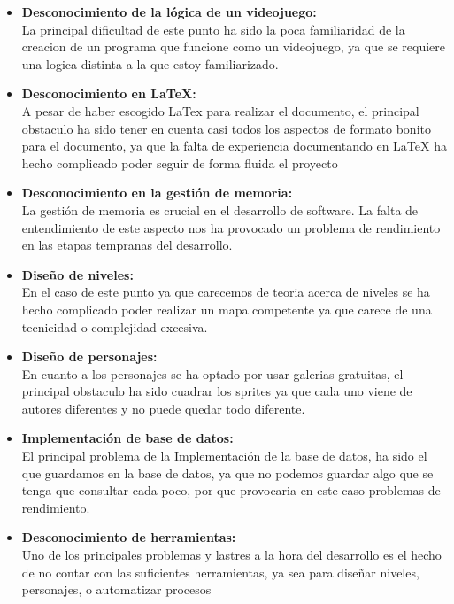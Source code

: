 \documentclass[a4paper]{article}
\begin{document}
    \begin{itemize}
        \item \textbf{Desconocimiento de la lógica de un videojuego:} \\
        La principal dificultad de este punto ha sido la poca familiaridad de la creacion de un programa que funcione como un videojuego, ya que se requiere una logica distinta a la que estoy familiarizado.
    
        \item \textbf{Desconocimiento en LaTeX:} \\
        A pesar de haber escogido LaTex para realizar el documento, el principal obstaculo ha sido tener en cuenta casi todos los aspectos de formato bonito para el documento, ya que la falta de experiencia
        documentando en LaTeX ha hecho complicado poder seguir de forma fluida el proyecto

        \item \textbf{Desconocimiento en la gestión de memoria:} \\
        La gestión de memoria es crucial en el desarrollo de software. La falta de entendimiento de este aspecto nos ha provocado un problema de rendimiento en las etapas tempranas del desarrollo.
    
        \item \textbf{Diseño de niveles:} \\
        En el caso de este punto ya que carecemos de teoria acerca de niveles se ha hecho complicado poder realizar un mapa competente ya que carece de una tecnicidad o complejidad excesiva.
       
        \item \textbf{Diseño de personajes:} \\
        En cuanto a los personajes se ha optado por usar galerias gratuitas, el principal obstaculo ha sido cuadrar los sprites ya que cada uno viene de autores diferentes y no puede quedar todo diferente.
        
        \item \textbf{Implementación de base de datos:} \\
        El principal problema de la Implementación de la base de datos, ha sido el que guardamos en la base de datos, ya que no podemos guardar algo que se tenga que consultar cada poco, por que provocaria
        en este caso problemas de rendimiento.

        \item \textbf{Desconocimiento de herramientas:} \\
        Uno de los principales problemas y lastres a la hora del desarrollo es el hecho de no contar con las suficientes herramientas, ya sea para diseñar niveles, personajes, o automatizar procesos

    \end{itemize}
\end{document}

